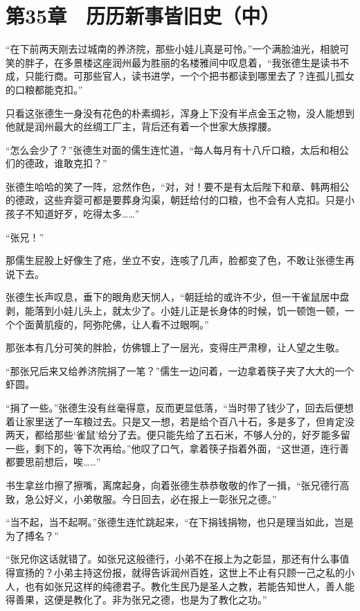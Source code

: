 \section{第35章　历历新事皆旧史（中）}

“在下前两天刚去过城南的养济院，那些小娃儿真是可怜。”一个满脸油光，相貌可笑的胖子，在多景楼这座润州最为胜丽的名楼雅间中叹息着，“我张德生是读书不成，只能行商。可那些官人，读书进学，一个个把书都读到哪里去了？连孤儿孤女的口粮都能克扣。”

只看这张德生一身没有花色的朴素绸衫，浑身上下没有半点金玉之物，没人能想到他就是润州最大的丝绸工厂主，背后还有着一个世家大族撑腰。

“怎么会少了？”张德生对面的儒生连忙道，“每人每月有十八斤口粮，太后和相公们的德政，谁敢克扣？”

张德生哈哈的笑了一阵，忿然作色，“对，对！要不是有太后陛下和章、韩两相公的德政，这些弃婴可都是要葬身沟渠，朝廷给付的口粮，也不会有人克扣。只是小孩子不知道好歹，吃得太多……”

“张兄！”

那儒生屁股上好像生了疮，坐立不安，连咳了几声，脸都变了色，不敢让张德生再说下去。

张德生长声叹息，垂下的眼角悲天悯人，“朝廷给的或许不少，但一干雀鼠居中盘剥，能落到小娃儿头上，就太少了。小娃儿正是长身体的时候，饥一顿饱一顿，一个个面黄肌瘦的，阿弥陀佛，让人看不过眼啊。”

那张本有几分可笑的胖脸，仿佛镀上了一层光，变得庄严肃穆，让人望之生敬。

“那张兄后来又给养济院捐了一笔？”儒生一边问着，一边拿着筷子夹了大大的一个虾圆。

“捐了一些。”张德生没有丝毫得意，反而更显低落，“当时带了钱少了，回去后便想着让家里送了一车粮过去。只是又一想，若是给个百八十石，多是多了，但肯定没两天，都给那些‘雀鼠’给分了去。便只能先给了五石米，不够人分的，好歹能多留一些，剩下的，等下次再给。”他叹了口气，拿着筷子指着外面，“这世道，连行善都要思前想后，唉……”

书生拿丝巾擦了擦嘴，离席起身，向着张德生恭恭敬敬的作了一揖，“张兄德行高致，急公好义，小弟敬服。今日回去，必在报上一彰张兄之德。”

“当不起，当不起啊。”张德生连忙跳起来，“在下捐钱捐物，也只是理当如此，岂是为了搏名？”

“张兄你这话就错了。如张兄这般德行，小弟不在报上为之彰显，那还有什么事值得宣扬的？小弟主持这份报，就得告诉润州百姓，这世上不止有只顾一己之私的小人，也有如张兄这样的纯德君子。教化生民乃是圣人之教，若能告知世人，善人能得善果，这便是教化了。非为张兄之德，也是为了教化之功。”

